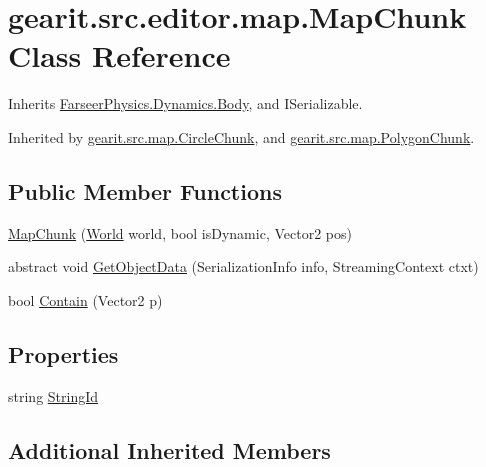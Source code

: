\hypertarget{classgearit_1_1src_1_1editor_1_1map_1_1_map_chunk}{\section{gearit.\+src.\+editor.\+map.\+Map\+Chunk Class Reference}
\label{classgearit_1_1src_1_1editor_1_1map_1_1_map_chunk}
}


Inherits \hyperlink{class_farseer_physics_1_1_dynamics_1_1_body}{Farseer\+Physics.\+Dynamics.\+Body}, and I\+Serializable.



Inherited by \hyperlink{classgearit_1_1src_1_1map_1_1_circle_chunk}{gearit.\+src.\+map.\+Circle\+Chunk}, and \hyperlink{classgearit_1_1src_1_1map_1_1_polygon_chunk}{gearit.\+src.\+map.\+Polygon\+Chunk}.

\subsection*{Public Member Functions}
\begin{DoxyCompactItemize}
\item 
\hyperlink{classgearit_1_1src_1_1editor_1_1map_1_1_map_chunk_ae0b8b7bcca9b23597369a727ed0da1a5}{Map\+Chunk} (\hyperlink{class_farseer_physics_1_1_dynamics_1_1_world}{World} world, bool is\+Dynamic, Vector2 pos)
\item 
abstract void \hyperlink{classgearit_1_1src_1_1editor_1_1map_1_1_map_chunk_a1e4a9bbf8186e0e06de790b9dc89fc2b}{Get\+Object\+Data} (Serialization\+Info info, Streaming\+Context ctxt)
\item 
bool \hyperlink{classgearit_1_1src_1_1editor_1_1map_1_1_map_chunk_aba26fed284b9daf6b705d1febc24e133}{Contain} (Vector2 p)
\end{DoxyCompactItemize}
\subsection*{Properties}
\begin{DoxyCompactItemize}
\item 
string \hyperlink{classgearit_1_1src_1_1editor_1_1map_1_1_map_chunk_ad9d6f2c5ffd94987364e86f932e6df92}{String\+Id}
\end{DoxyCompactItemize}
\subsection*{Additional Inherited Members}


